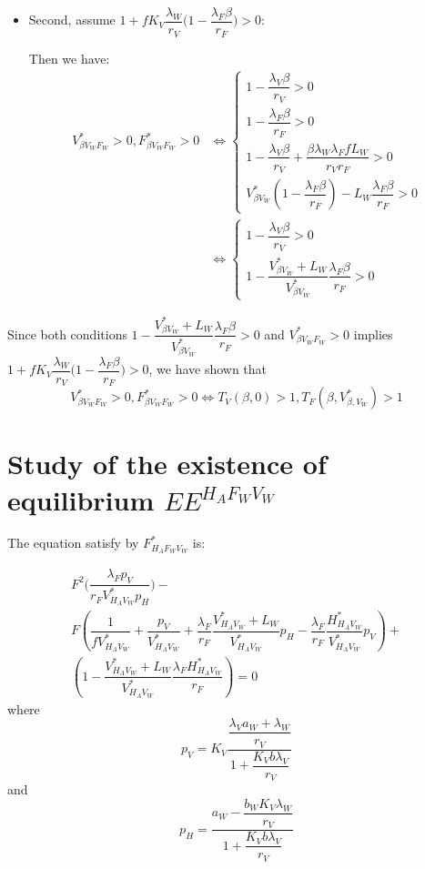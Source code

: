 \documentclass{article}
\newcommand{\lfw}{\lambda_{F}}
\newcommand{\lvw}{\lambda_{V}}
\newcommand{\lfv}{\lambda_{W}}
\begin{document}
\begin{appendices}
\begin{itemize}
\item Second, assume $1 + f K_V \dfrac{\lfv}{r_V} \Big(1 - \dfrac{\lfw \beta}{r_F}\Big) > 0$:

Then we have:
\begin{align*}
V^*_{\beta V_WF_W} > 0, F^*_{\beta V_WF_W} > 0 &\Leftrightarrow \left\lbrace \begin{array}{l}
1 - \dfrac{\lvw \beta}{r_V} > 0 \\
1 - \dfrac{\lfw \beta}{r_F} > 0 \\
1 - \dfrac{\lvw \beta}{r_V} + \dfrac{\beta \lfv \lfw f L_W}{r_V r_F} > 0 \\
V^*_{\beta V_W} (1 - \dfrac{\lfw \beta}{r_F} ) - L_W \dfrac{\lfw \beta}{r_F} > 0
\end{array} \right. \\
& \Leftrightarrow \left\lbrace \begin{array}{l}
1 - \dfrac{\lvw \beta}{r_V} > 0 \\
1 - \dfrac{V^*_{\beta V_W} + L_W}{V^*_{\beta V_W}} \dfrac{\lfw \beta}{r_F} > 0
\end{array} \right.
\end{align*}
\end{itemize}

Since both conditions $1 - \dfrac{V^*_{\beta V_W} + L_W}{V^*_{\beta V_W}} \dfrac{\lfw \beta}{r_F} > 0$ and $V^*_{\beta V_WF_W} > 0$ implies $1 + f K_V \dfrac{\lfv}{r_V} \Big(1 - \dfrac{\lfw \beta}{r_F}\Big) > 0$, we have shown that 
$$V^*_{\beta V_WF_W} > 0, F^*_{\beta V_WF_W} > 0 \Leftrightarrow T_V(\beta, 0)>1, T_F(\beta, V^*_{\beta, V_W}) > 1 $$


\section{Study of the existence of equilibrium $EE^{H_AF_WV_W}$ \label{appendix:anthropicWildHAFWVW:existenceHAFWVW}}


The equation satisfy by $F^*_{H_AF_WV_W}$ is:

\begin{multline}
F^2 \Big(\dfrac{\lfw p_V}{r_F V^*_{H_AV_W} p_H} \Big) - \\
F \left(\dfrac{1}{fV^*_{H_AV_W}} + \dfrac{p_V}{V^*_{H_AV_W}} + \dfrac{\lfw}{r_F} \dfrac{V^*_{H_AV_W} + L_W}{V^*_{H_AV_W}}p_H - \dfrac{\lfw}{r_F} \dfrac{H^*_{H_AV_W}}{V^*_{H_AV_W}}p_V\right) + \\
 \left(1 - \dfrac{V^*_{H_AV_W} + L_W}{V^*_{H_AV_W}} \dfrac{\lfw H^*_{H_AV_W}}{r_F} \right) = 0
\label{equilibreHAFWVW:equationFW}
\end{multline}
where 
$$ p_V = K_V \dfrac{\dfrac{\lvw a_W + \lfv}{r_V}}{1 + \dfrac{K_V b \lvw}{r_V}}$$
and
$$p_H = \dfrac{a_W - \dfrac{b_W K_V \lfv}{r_V}}{1 + \dfrac{K_V b \lvw}{r_V}}$$



\end{appendices}
\end{document}
